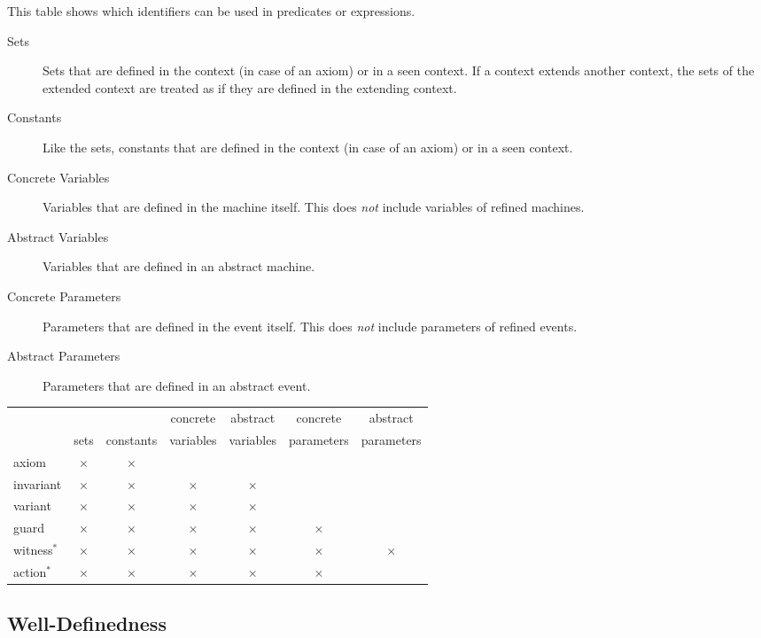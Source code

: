 This table shows which identifiers can be used in predicates or expressions. 
\begin{description}
\item[Sets] Sets that are defined in the context (in case of an axiom) or in a seen context.
  If a context extends another context, the sets of the extended context are treated as if they
  are defined in the extending context.
\item[Constants] Like the sets, constants that are defined in the context (in case of an axiom) or
  in a seen context.
\item[Concrete Variables] Variables that are defined in the machine itself. This does \emph{not}
  include variables of refined machines.
\item[Abstract Variables] Variables that are defined in an abstract machine.
\item[Concrete Parameters] Parameters that are defined in the event itself. This does \emph{not}
  include parameters of refined events.
\item[Abstract Parameters] Parameters that are defined in an abstract event.
\end{description}

\begin{center}
  \newcommand{\markcell}{$\times$}
  \begin{tabular}{lcccccc}
  \hline
            &           &           & concrete  & abstract  & concrete   & abstract \\
            & sets      & constants & variables & variables & parameters & parameters \\
  \hline
  axiom     & \markcell & \markcell &           &           &            & \\
  invariant & \markcell & \markcell & \markcell & \markcell &            & \\
  variant   & \markcell & \markcell & \markcell & \markcell &            & \\
  guard     & \markcell & \markcell & \markcell & \markcell & \markcell  & \\
  witness$^{*}$   & \markcell & \markcell & \markcell & \markcell & \markcell  & \markcell \\
  action$^{*}$    & \markcell & \markcell & \markcell & \markcell & \markcell  &  \\
  \hline
  \end{tabular}    
\end{center}


\subsection{Well-Definedness}
\label{well_definedness}

